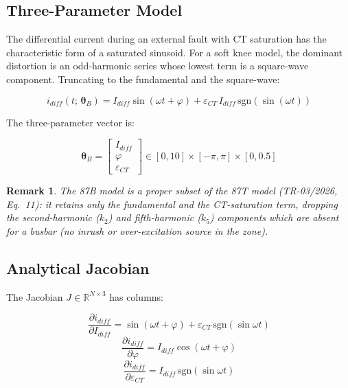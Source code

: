 \documentclass[12pt,a4paper]{article}
\newtheorem{remark}{Remark}[section]
\newcommand{\thetaB}{\boldsymbol{\theta}_B}
\begin{document}
\subsection{Three-Parameter Model}
\label{sec:3param}

The differential current during an external fault with CT saturation has the
characteristic form of a saturated sinusoid.  For a soft knee model, the
dominant distortion is an odd-harmonic series whose lowest term is a
square-wave component.  Truncating to the fundamental and the square-wave:

\begin{equation}
  i_{diff}(t;\,\thetaB) =
    I_{diff}\sin(\omega t + \varphi)
    + \varepsilon_{CT}\,I_{diff}\,\mathrm{sgn}(\sin(\omega t))
  \label{eq:87B_model}
\end{equation}

The three-parameter vector is:

\begin{equation}
  \thetaB = \begin{bmatrix} I_{diff} \\ \varphi \\ \varepsilon_{CT} \end{bmatrix}
  \in [0,10]\times[-\pi,\pi]\times[0,0.5]
  \label{eq:theta_B}
\end{equation}

\begin{remark}
  The 87B model is a proper subset of the 87T model (TR-03/2026, Eq.~11):
  it retains only the fundamental and the CT-saturation term, dropping the
  second-harmonic ($k_2$) and fifth-harmonic ($k_5$) components which are
  absent for a busbar (no inrush or over-excitation source in the zone).
\end{remark}

\subsection{Analytical Jacobian}
\label{sec:jac}

The Jacobian $J \in \mathbb{R}^{N \times 3}$ has columns:

\begin{equation}
  \frac{\partial i_{diff}}{\partial I_{diff}} = \sin(\omega t + \varphi)
    + \varepsilon_{CT}\,\mathrm{sgn}(\sin\omega t)
  \label{eq:J1}
\end{equation}
\begin{equation}
  \frac{\partial i_{diff}}{\partial \varphi} = I_{diff}\cos(\omega t + \varphi)
  \label{eq:J2}
\end{equation}
\begin{equation}
  \frac{\partial i_{diff}}{\partial \varepsilon_{CT}} =
    I_{diff}\,\mathrm{sgn}(\sin\omega t)
  \label{eq:J3}
\end{equation}
\end{document}

